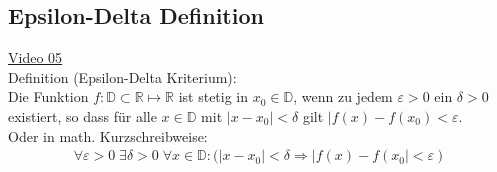 \subsection{Epsilon-Delta Definition}
\href{https://youtu.be/4twSaHZ1G3g}{Video 05}\\
Definition (Epsilon-Delta Kriterium):\vspace*{2mm}\\
Die Funktion $ f:\mathbb{D}\subset \mathbb{R}\longmapsto\mathbb{R} $ ist stetig in $ x_0\in \mathbb{D} $, wenn zu jedem $ \varepsilon > 0 $ ein $ \delta>0 $ existiert, so dass für alle $ x\in \mathbb{D} $ mit $ |x-x_0|<\delta $ gilt $ |f(x)-f(x_0)<\varepsilon $.\\
Oder in math. Kurzschreibweise:\\
\begin{align*}
\forall\varepsilon>0\;\exists\delta>0\;\forall x\in \mathbb{D}:(|x-x_0|<\delta\Rightarrow|f(x)-f(x_0|<\varepsilon)
\end{align*}
